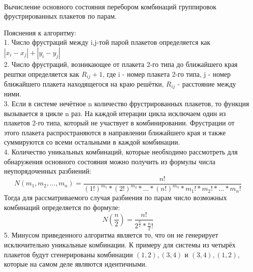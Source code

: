 \documentclass[utf8, babel, sor, jor, amsmath, amssymb, reprint]{elsarticle} %
\begin{document}
\begin{algorithm}[H]
\begin{algorithmic}
{{{{			\ENDIF\\
			}
			\ENDFOR\\
		}
			\ENDIF\\
		}
		\ENDFOR\\
		}
		{
			{
			}
		\ELSE 
		{}
		\ENDIF\\}
		\ENDFOR\\
	\end{algorithmic}
	\caption{Вычисление основного состояния перебором комбинаций группировок фрустрированных плакетов по парам.}
	\label{alg:alg_2}
\end{algorithm}

Пояснения к алгоритму:\\
1. Число фрустраций между i,j-той парой плакетов определяется как $\left|x_i-x_j\right|+\left|y_i-y_j\right|$\\
2. Число фрустраций, возникающее от плакета 2-го типа до ближайшего края рештки определяется как $R_{ij}+1$, где i - номер плакета 2-го типа, j - номер ближайшего плакета находящегося на краю решётки, $R_{ij}$ - расстояние между ними.\\
3. Если в системе нечётное n количество фрустрированных плакетов, то функция вызывается в цикле n раз. На каждой итерации цикла исключаем один из плакетов 2-го типа, который не участвует в комбинировании. Фрустрации от этого плакета распространяются в направлении ближайшего края и также суммируются со всеми остальными в каждой комбинации.\\
4. Количество уникальных комбинаций, которые необходимо рассмотреть для обнаружения основного состояния можно получить из формулы числа неупорядоченных разбиений:
\begin{equation}
	N(m_1,m_2,...,m_n)=\dfrac{n!}{(1!)^{m_1}*(2!)^{m_2}*...*(n!)^{m_n}*m_1!*m_2!*...*m_n!}
	\label{eq:unordered_partitions}
\end{equation}
Тогда для рассматриваемого случая разбиения по парам число возможных комбинаций определяется по формуле:
\begin{equation}
	N(\frac{n}{2})=\dfrac{n!}{2^{\frac{n}{2}}*\frac{n}{2}!}
	\label{eq:unordered_partitions2}
\end{equation}
5. Минусом приведенного алгоритма является то, что он не генерирует исключительно уникальные комбинации. К примеру для системы из четырёх плакетов будут сгенерированы комбинации ${(1,2),(3,4)}$ и ${(3,4),(1,2)}$, которые на самом деле являются идентичными.
\end{document}
